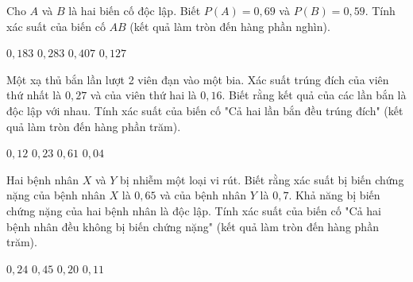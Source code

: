 \documentclass[12pt,a4paper]{article}
\begin{document}
\begin{ex}
 Cho ${A}$ và ${B}$ là hai biến cố độc lập. Biết $P(A)=0,69$ và $P(B)=0,59$. Tính xác suất của biến cố ${AB}$ (kết quả làm tròn đến hàng phần nghìn).
 
\choice
{ ${0,183}$ }
   { ${0,283}$ }
     { \True ${0,407}$ }
    { ${0,127}$ }
\end{ex}

\begin{ex}
 Một xạ thủ bắn lần lượt 2 viên đạn vào một bia. Xác suất trúng đích của viên thứ nhất là ${0,27}$ và của viên thứ hai là ${0,16}$. Biết rằng kết quả của các lần bắn là độc lập với nhau. Tính xác suất của biến cố "Cả hai lần bắn đều trúng đích" (kết quả làm tròn đến hàng phần trăm).
 
\choice
{ ${0,12}$ }
   { ${0,23}$ }
     { ${0,61}$ }
    { \True ${0,04}$ }
\end{ex}

\begin{ex}
 Hai bệnh nhân ${X}$ và ${Y}$ bị nhiễm một loại vi rút. Biết rằng xác suất bị biến chứng nặng của bệnh nhân ${X}$ là ${0,65}$ và của bệnh nhân ${Y}$ là ${0,7}$. Khả năng bị biến chứng nặng của hai bệnh nhân là độc lập. Tính xác suất của biến cố "Cả hai bệnh nhân đều không bị biến chứng nặng" (kết quả làm tròn đến hàng phần trăm).
 
\choice
{ ${0,24}$ }
   { ${0,45}$ }
     { ${0,20}$ }
    { \True ${0,11}$ }
\end{ex}
\end{document}
